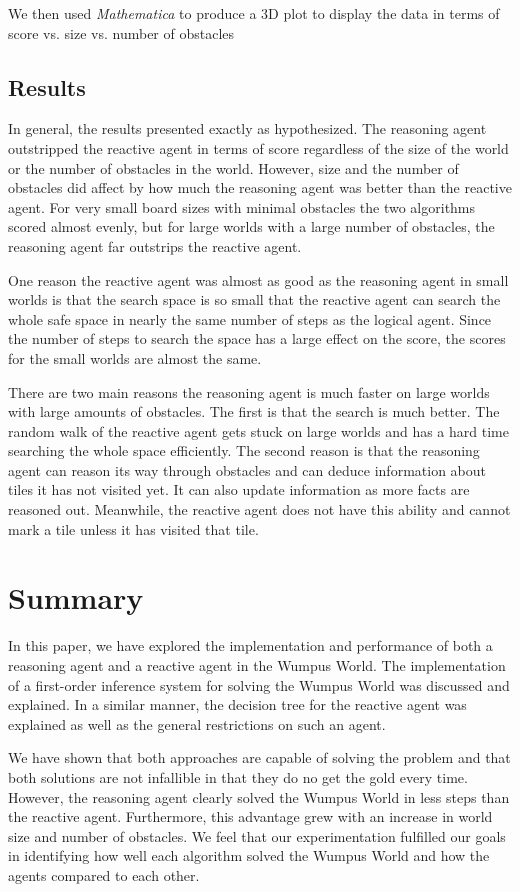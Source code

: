 \documentclass{article}
\begin{document}
	We then used \textit{Mathematica}  to produce a 3D plot to display the data in terms of score vs. size vs. number of obstacles
	
	\subsection{Results}
		In general, the results presented exactly as hypothesized. The reasoning agent outstripped the reactive agent in terms of score regardless of the size of the world or the number of obstacles in the world. 
		However, size and the number of obstacles did affect by how much the reasoning agent was better than the reactive agent. 
		For very small board sizes with minimal obstacles the two algorithms scored almost evenly, but for large worlds with a  large number of obstacles, the reasoning agent far outstrips the reactive agent.
		
		One reason the reactive agent was almost as good as the reasoning agent in small worlds is that the search space is so small that the reactive agent can search the whole safe space in nearly the same number of steps as the logical agent.
	 Since the number of steps to search the space has a large effect on the score, the scores for the small worlds are almost the same. 
		
		There are two main reasons the reasoning agent is much faster on large worlds with large amounts of obstacles.
		 The first is that the search is much better.
		  The random walk of the reactive agent gets stuck on large worlds and has a hard time searching the whole space efficiently.
		   The second reason is that the reasoning agent can reason its way through obstacles and can deduce information about tiles it has not visited yet.
		    It can also update information as more facts are reasoned out.
		     Meanwhile, the reactive agent does not have this ability and cannot mark a tile unless it has visited that tile.
	
\section{Summary}
In this paper, we have explored the implementation and performance of both a reasoning agent and a reactive agent in the Wumpus World. The implementation of a first-order inference system for solving the Wumpus World was discussed and explained. In a similar manner, the decision tree for the reactive agent was explained as well as the general restrictions on such an agent.

We have shown that both approaches are capable of solving the problem and that both solutions are not infallible in that they do no get the gold every time. However, the reasoning agent clearly solved the Wumpus World in less steps than the reactive agent. Furthermore, this advantage grew with an increase in world size and number of obstacles. We feel that our experimentation fulfilled our goals in identifying how well each algorithm solved the Wumpus World and how the agents compared to each other.


	

	\pagebreak


	
	
	
\end{document}
